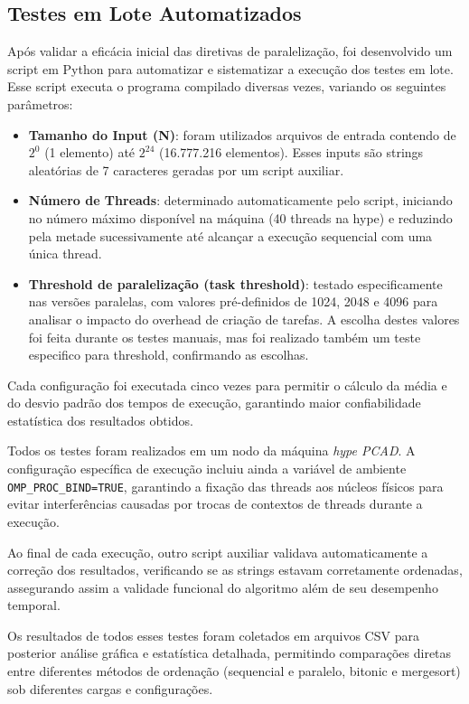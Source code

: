\documentclass{article}
\begin{document}
\subsection{Testes em Lote Automatizados}

Após validar a eficácia inicial das diretivas de paralelização, foi desenvolvido um script em Python para automatizar e sistematizar a execução dos testes em lote. Esse script executa o programa compilado diversas vezes, variando os seguintes parâmetros:

\begin{itemize}
\item \textbf{Tamanho do Input (N)}: foram utilizados arquivos de entrada contendo de $2^0$ (1 elemento) até $2^{24}$ (16.777.216 elementos). Esses inputs são strings aleatórias de 7 caracteres geradas por um script auxiliar.
\item \textbf{Número de Threads}: determinado automaticamente pelo script, iniciando no número máximo disponível na máquina (40 threads na hype) e reduzindo pela metade sucessivamente até alcançar a execução sequencial com uma única thread.
\item \textbf{Threshold de paralelização (task threshold)}: testado especificamente nas versões paralelas, com valores pré-definidos de 1024, 2048 e 4096 para analisar o impacto do overhead de criação de tarefas. A escolha destes valores foi feita durante os testes manuais, mas foi realizado também um teste especifico para threshold, confirmando as escolhas.
\end{itemize}

Cada configuração foi executada cinco vezes para permitir o cálculo da média e do desvio padrão dos tempos de execução, garantindo maior confiabilidade estatística dos resultados obtidos.

Todos os testes foram realizados em um nodo da máquina \textit{hype PCAD}. A configuração específica de execução incluiu ainda a variável de ambiente \texttt{OMP\_PROC\_BIND=TRUE}, garantindo a fixação das threads aos núcleos físicos para evitar interferências causadas por trocas de contextos de threads durante a execução.

Ao final de cada execução, outro script auxiliar validava automaticamente a correção dos resultados, verificando se as strings estavam corretamente ordenadas, assegurando assim a validade funcional do algoritmo além de seu desempenho temporal.

Os resultados de todos esses testes foram coletados em arquivos CSV para posterior análise gráfica e estatística detalhada, permitindo comparações diretas entre diferentes métodos de ordenação (sequencial e paralelo, bitonic e mergesort) sob diferentes cargas e configurações.
\end{document}
